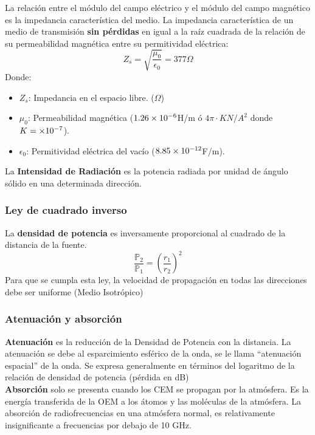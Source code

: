 \documentclass[
	12pt, %
	fleqn, %
	a4paper, %
	oneside, %
]{LegrandOrangeBook}
\begin{document}
\begin{definition}
La relación entre el módulo del campo eléctrico y el módulo del campo magnético es la impedancia característica del medio. La impedancia característica de un medio de transmisión \textbf{sin pérdidas} en igual a la raíz cuadrada de la relación de su permeabilidad magnética entre su permitividad eléctrica:
\begin{equation}
Z_s=\sqrt{\frac{\mu_0}{\epsilon_0}}=377\Omega
\label{eq:imp carac espacio libre}
\end{equation}
Donde:
\begin{itemize}
\item $Z_s$: Impedancia en el espacio libre. ($\Omega$)
\item $\mu_0$: Permeabilidad magnética ($1.26\times 10^{-6}$H/m ó $4\pi\cdot K N/A^2$ donde $K=\times 10^{-7}$).
\item $\epsilon_0$: Permitividad eléctrica del vacío ($8.85\times 10^{-12}$F/m).
\end{itemize}
\end{definition}
La \textbf{Intensidad de Radiación} es la potencia radiada por unidad de ángulo sólido en una determinada dirección.
\subsubsection{Ley de cuadrado inverso}
La \textbf{densidad de potencia} es inversamente proporcional al cuadrado de la distancia de la fuente.
\begin{equation}
\frac{\mathbb{P}_2}{\mathbb{P}_1}=\left(\frac{r_1}{r_2}\right)^2
\label{eq:ley cuadrado inverso}
\end{equation}
Para que se cumpla esta ley, la velocidad de propagación en todas las direcciones debe ser uniforme (Medio Isotrópico)
\subsubsection*{Atenuación y absorción}
\textbf{Atenuación} es la reducción de la Densidad de Potencia con la distancia. La atenuación se debe al esparcimiento esférico de la onda, se le llama ``atenuación espacial'' de la onda. Se expresa generalmente en términos del logaritmo de la relación de  densidad de  potencia (pérdida en dB)\\
\textbf{Absorción} solo se presenta cuando los CEM se propagan por la atmósfera. Es la energía transferida de la OEM a los átomos y las moléculas de la atmósfera. La absorción de radiofrecuencias en una atmósfera normal, es relativamente insignificante a frecuencias por debajo de 10 GHz.
\end{document}

